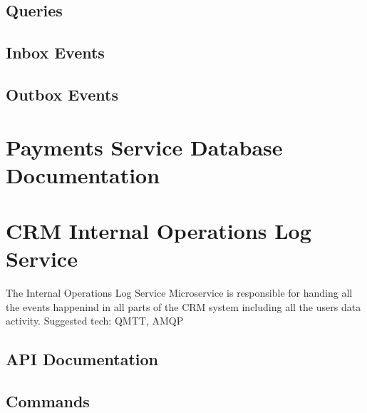 \documentclass[letterpaper,10pt,english]{sphinxmanual}
\begin{document}
\subsection{Queries}
\label{\detokenize{crm_system/orders_service:queries}}

\subsection{Inbox Events}
\label{\detokenize{crm_system/orders_service:inbox-events}}

\subsection{Outbox Events}
\label{\detokenize{crm_system/orders_service:outbox-events}}

\section{Payments Service Database Documentation}
\label{\detokenize{crm_system/orders_service:payments-service-database-documentation}}
\sphinxstepscope


\section{CRM Internal Operations Log Service}
\label{\detokenize{crm_system/internal_operations_log_service:crm-internal-operations-log-service}}\label{\detokenize{crm_system/internal_operations_log_service::doc}}
\sphinxAtStartPar
The Internal Operations Log Service Microservice is responsible for handing all the events happenind in all parts of the CRM system including all the users data activity.
Suggested tech: QMTT, AMQP



\subsection{API Documentation}
\label{\detokenize{crm_system/internal_operations_log_service:api-documentation}}

\subsection{Commands}
\label{\detokenize{crm_system/internal_operations_log_service:commands}}
\end{document}
